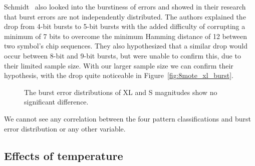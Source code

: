 Schmidt~\etal{} also looked into the burstiness of errors and showed in their research that burst errors are not independently distributed.
The authors explained the drop from 4-bit bursts to 5-bit bursts with the added difficulty of corrupting a minimum of 7 bits to overcome the minimum Hamming distance of 12 between two symbol's chip sequences.
They also hypothesized that a similar drop would occur between 8-bit and 9-bit bursts, but were unable to confirm this, due to their limited sample size.
With our larger sample size we can confirm their hypothesis, with the drop quite noticeable in Figure~\ref{fig:8mote_xl_burst}.

\begin{figure}[ht]
	\caption{The burst error distributions of XL and S magnitudes show no significant difference.}
	\label{fig:8mote_burst_error}
\end{figure}

We cannot see any correlation between the four pattern classifications and burst error distribution or any other variable.

\subsection{Effects of temperature}
\label{subsec:effects_of_temperature}

